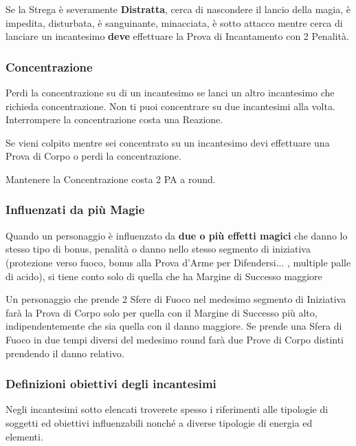 \documentclass[12pt,a4paper,twoside,openany]{book}
\begin{document}
\begin{multicols}{2}
Se la Strega è severamente \textbf{Distratta}, cerca di nascondere il lancio della magia, è impedita, disturbata, è sanguinante, minacciata, è sotto attacco mentre cerca di lanciare un incantesimo \textbf{deve} effettuare la Prova di Incantamento con 2 Penalità.

\subsubsection{Concentrazione}\label{magieconcentrazione}

Perdi la concentrazione su di un incantesimo se lanci un altro incantesimo che richieda concentrazione. Non ti puoi concentrare su due incantesimi alla volta. Interrompere la concentrazione costa una Reazione.

Se vieni colpito mentre sei concentrato su un incantesimo devi effettuare una Prova di Corpo o perdi la concentrazione.

Mantenere la Concentrazione costa 2 PA a round.

\subsubsection{Influenzati da più Magie}\label{magieinfluenzatodapiumagie}

Quando un personaggio è influenzato da \textbf{due o più effetti magici} che danno lo stesso tipo di bonus, penalità o danno nello stesso segmento di iniziativa (protezione verso fuoco, bonus alla Prova d'Arme per Difendersi... , multiple palle di acido), si tiene conto solo di quella che ha Margine di Successo maggiore

Un personaggio che prende 2 Sfere di Fuoco nel medesimo segmento di Iniziativa farà la Prova di Corpo solo per quella con il Margine di Successo più alto, indipendentemente che sia quella con il danno maggiore. Se prende una Sfera di Fuoco in due tempi diversi del medesimo round farà due Prove di Corpo distinti prendendo il danno relativo.

\subsubsection{Definizioni obiettivi degli incantesimi}\label{magiedefinizioniobiettivi}

Negli incantesimi sotto elencati troverete spesso i riferimenti alle tipologie di soggetti ed obiettivi influenzabili nonché a diverse tipologie di energia ed elementi.


\end{multicols}
\end{document}
